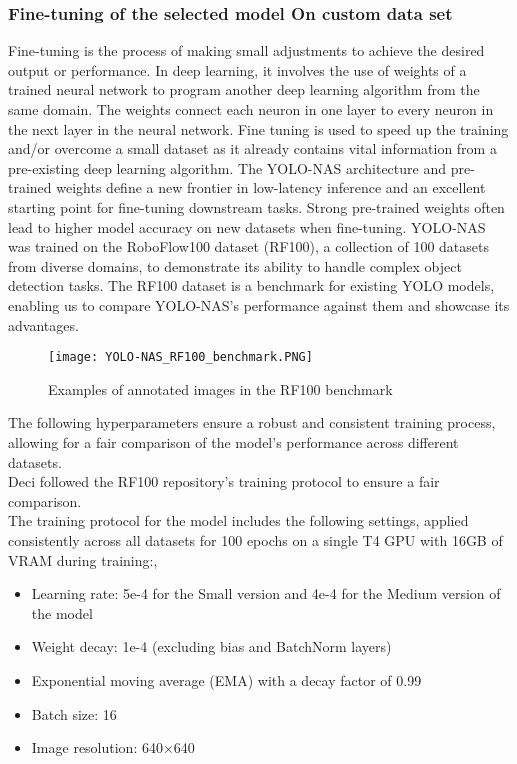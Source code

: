\subsubsection{Fine-tuning of the selected model On custom data set}
Fine-tuning is the process of making small adjustments to achieve the desired output or performance. In deep learning, it involves the use of weights of a trained neural network to program another deep learning algorithm from the same domain. The weights connect each neuron in one layer to every neuron in the next layer in the neural network. Fine tuning is used to speed up the training and/or overcome a small dataset as it already contains vital information from a pre-existing deep learning algorithm. The YOLO-NAS architecture and pre-trained weights define a new frontier in low-latency inference and an excellent starting point for fine-tuning downstream tasks. Strong pre-trained weights often lead to higher model accuracy on new datasets when fine-tuning. YOLO-NAS was trained on the RoboFlow100 dataset (RF100), a collection of 100 datasets from diverse domains, to demonstrate its ability to handle complex object detection tasks. The RF100 dataset is a benchmark for existing YOLO models, enabling us to compare YOLO-NAS’s performance against them and showcase its advantages.\cite{YOLO-NAS}
\begin{figure}[H]
    \centering
    \texttt{[image: YOLO-NAS\_RF100\_benchmark.PNG]}
    \caption{Examples of annotated images in the RF100 benchmark}
    \label{fig:YOLO-NAS_RF100_benchmark}
\end{figure}
The following hyperparameters ensure a robust and consistent training process, allowing for a fair comparison of the model’s performance across different datasets.\\
Deci followed the RF100 repository’s training protocol to ensure a fair comparison.\\
The training protocol for the model includes the following settings, applied consistently across all datasets for 100 epochs on a single T4 GPU with 16GB of VRAM during training:\cite{YOLO-NAS}, \cite{yolo-nas-vs-yolov8}
\begin{itemize}
    \item Learning rate: 5e-4 for the Small version and 4e-4 for the Medium version of the model
    \item Weight decay: 1e-4 (excluding bias and BatchNorm layers)
    \item Exponential moving average (EMA) with a decay factor of 0.99
    \item Batch size: 16
    \item Image resolution: 640×640
\end{itemize}



